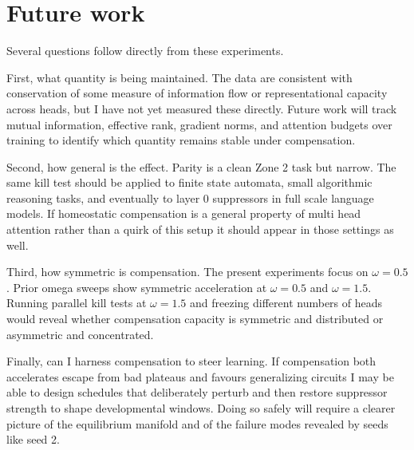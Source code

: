 \section{Future work}

Several questions follow directly from these experiments.

First, what quantity is being maintained. The data are consistent with conservation of some measure of information flow or representational capacity across heads, but I have not yet measured these directly. Future work will track mutual information, effective rank, gradient norms, and attention budgets over training to identify which quantity remains stable under compensation.

Second, how general is the effect. Parity is a clean Zone 2 task but narrow. The same kill test should be applied to finite state automata, small algorithmic reasoning tasks, and eventually to layer 0 suppressors in full scale language models. If homeostatic compensation is a general property of multi head attention rather than a quirk of this setup it should appear in those settings as well.

Third, how symmetric is compensation. The present experiments focus on $\omega = 0.5$. Prior omega sweeps show symmetric acceleration at $\omega = 0.5$ and $\omega = 1.5$. Running parallel kill tests at $\omega = 1.5$ and freezing different numbers of heads would reveal whether compensation capacity is symmetric and distributed or asymmetric and concentrated.

Finally, can I harness compensation to steer learning. If compensation both accelerates escape from bad plateaus and favours generalizing circuits I may be able to design schedules that deliberately perturb and then restore suppressor strength to shape developmental windows. Doing so safely will require a clearer picture of the equilibrium manifold and of the failure modes revealed by seeds like seed 2.
